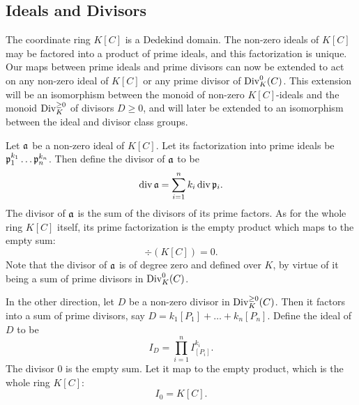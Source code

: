 \subsection{Ideals and Divisors}

The coordinate ring $K[C]$ is a Dedekind domain.
The non-zero ideals of $K[C]$ may be factored into a product of prime ideals, and this factorization is unique.
Our maps between prime ideals and prime divisors can now be extended
to act on any non-zero ideal of $K[C]$ or any prime divisor of $\Div_K^0(C)$.
This extension will be an isomorphism between the monoid of non-zero $K[C]$-ideals
and the monoid $\Div_K^{\geq 0}$ of divisors $D \geq 0$,
and will later be extended to an isomorphism between the ideal and divisor class groups.

Let $\frak a$ be a non-zero ideal of $K[C]$.
Let its factorization into prime ideals be $\frak p_1^{k_1} \dots \frak p_n^{k_n}$.
Then define the divisor of $\frak a$ to be
\[ \div \frak a = \sum_{i=1}^n k_i \div \frak p_i. \]
The divisor of $\frak a$ is the sum of the divisors of its prime factors.
As for the whole ring $K[C]$ itself,
its prime factorization is the empty product which maps to the empty sum:
  \[ \div (K[C]) = 0. \]
Note that the divisor of $\frak a$ is of degree zero and defined over $K$,
by virtue of it being a sum of prime divisors in $\Div_K^0(C)$.

In the other direction, let $D$ be a non-zero divisor in $\Div_K^{\geq 0}(C)$.
Then it factors into a sum of prime divisors, say $D = k_1[P_1] + \dots + k_n[P_n]$.
Define the ideal of $D$ to be
\[ I_D = \prod_{i=1}^n I_{[P_i]}^{k_i}. \]
The divisor 0 is the empty sum.
Let it map to the empty product, which is the whole ring $K[C]$:
\[ I_{0} = K[C]. \]

